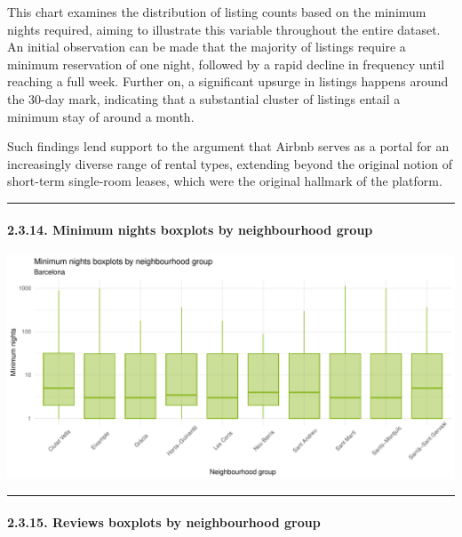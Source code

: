 \documentclass[
]{article}
\begin{document}
This chart examines the distribution of listing counts based on the
minimum nights required, aiming to illustrate this variable throughout
the entire dataset. An initial observation can be made that the majority
of listings require a minimum reservation of one night, followed by a
rapid decline in frequency until reaching a full week. Further on, a
significant upsurge in listings happens around the 30-day mark,
indicating that a substantial cluster of listings entail a minimum stay
of around a month.

Such findings lend support to the argument that Airbnb serves as a
portal for an increasingly diverse range of rental types, extending
beyond the original notion of short-term single-room leases, which were
the original hallmark of the platform.

\begin{center}\rule{0.5\linewidth}{0.5pt}\end{center}

\hypertarget{minimum-nights-boxplots-by-neighbourhood-group}{%
\paragraph{2.3.14. Minimum nights boxplots by neighbourhood
group}\label{minimum-nights-boxplots-by-neighbourhood-group}}

\begin{center}\includegraphics{Barcelona-AirBnB-Insights_files/figure-latex/plot14-1} \end{center}

\begin{center}\rule{0.5\linewidth}{0.5pt}\end{center}

\hypertarget{reviews-boxplots-by-neighbourhood-group}{%
\paragraph{2.3.15. Reviews boxplots by neighbourhood
group}\label{reviews-boxplots-by-neighbourhood-group}}
\end{document}
